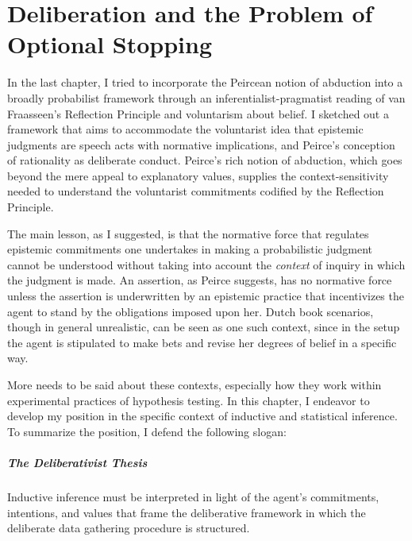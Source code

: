 
\hypertarget{deliberation-and-the-problem-of-optional-stopping}{%
\chapter{Deliberation and the Problem of Optional
Stopping}\label{ch:stopping}}

In the last chapter, I tried to incorporate the Peircean notion of
abduction into a broadly probabilist framework through an inferentialist-pragmatist reading of van
Fraasseen's Reflection Principle and voluntarism about belief. I sketched out a framework that aims to accommodate the
voluntarist idea that epistemic judgments are speech acts with normative
implications, and Peirce's conception of rationality as deliberate
conduct. Peirce's rich notion of abduction, which
goes beyond the mere appeal to explanatory values, supplies the context-sensitivity needed to understand the voluntarist commitments codified by the Reflection Principle.

The main lesson, as I suggested, is that the normative force that regulates
epistemic commitments one undertakes in making a probabilistic judgment cannot
be understood without taking into account the \emph{context} of inquiry in which the judgment is made. An
assertion, as Peirce suggests, has no normative force unless the
assertion is underwritten by an epistemic practice that incentivizes the
agent to stand by the obligations imposed upon her. Dutch book
scenarios, though in general unrealistic, can be seen as one such
context, since in the setup the agent is stipulated to make bets and
revise her degrees of belief in a specific way.

More needs to be said about these contexts, especially how they work within experimental practices of hypothesis testing. In this chapter, I endeavor to develop my position in the specific
context of inductive and statistical inference. To summarize the position, I 
defend the following slogan:
\paragraph{The Deliberativist Thesis} Inductive inference must be interpreted in
light of the agent's commitments, intentions, and values that frame the deliberative framework in which the deliberate data gathering procedure is structured.\\


